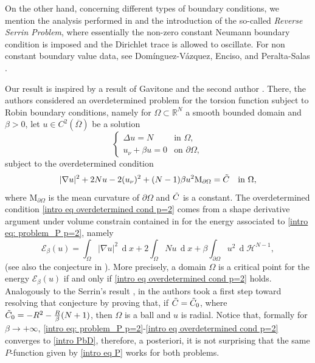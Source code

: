 \documentclass[10pt,a4paper, reqno]{amsart}
\numberwithin{equation}{section}
\newcommand{\R}{\mathbb{R}}
\renewcommand{\d}[1]{\ensuremath{\operatorname{d}\!{#1}}}
\begin{document}
On the other hand, concerning different types of boundary conditions, we mention the analysis performed in \cite{mmp} and the introduction of the so-called \textit{Reverse Serrin Problem}, where essentially the non-zero constant Neumann boundary condition is imposed and the Dirichlet trace is allowed to oscillate. For non constant boundary value data, see Dom\'inguez-V\'azquez, Enciso, and Peralta-Salas \cite{dep23}. 

Our result is inspired by a result of Gavitone and the second author \cite{gamo26}. There, the authors considered an overdetermined problem for the torsion function subject to Robin boundary conditions, namely for $\Omega \subset \R^N$ a smooth bounded domain and $\beta > 0$, let $u \in C^2(\overline{\Omega})$ be a solution
\begin{equation} \label{intro eq: problem_P p=2}
    \begin{cases}
    \Delta u = N & \text{in } \Omega, \\
    u_\nu  + \beta u = 0 & \text{on } \partial\Omega,
    \end{cases}
\end{equation}
subject to the overdetermined condition
\begin{equation}\label{intro eq overdetermined cond p=2}
    |\nabla u|^2 + 2Nu - 2(u_\nu)^2 + (N-1) \beta u^2 \mathrm{M}_{\partial\Omega} = \Tilde{C} \quad \text{in } \Omega,
\end{equation}
where $\mathrm{M}_{\partial\Omega}$ is the mean curvature of $\partial \Omega$ and $\Tilde{C}$ is a constant. The overdetermined condition \eqref{intro eq overdetermined cond p=2} comes from a shape derivative argument under volume constrain contained in \cite{bw} for the energy associated to \eqref{intro eq: problem_P p=2}, namely 
\begin{equation*}
    \mathcal{E}_{\beta}(u) = \int_{\Omega} |\nabla u|^2 \,\d{x} + 2 \int_{\Omega} N u \,\d x + \beta  \int_{\partial\Omega} u^2 \, \d{}\mathcal{H}^{N-1},
\end{equation*}
(see also the conjecture in \cite[Thm. 4.1 \& Ex. 4.1]{bw}). More precisely, a domain $\Omega$ is a critical point for the energy $ \mathcal{E}_{\beta}(u)$ if and only if \eqref{intro eq overdetermined cond p=2} holds. Analogously to the Serrin's result \cite{serrin}, in \cite{gamo26} the authors took a first step toward resolving that conjecture by proving that, if $\Tilde{C} = \Tilde{C}_0$, where $\Tilde{C}_0 = -R^{2} - \frac{R}{\beta} (N + 1)$, then $\Omega$ is a ball and $u$ is radial. Notice that, formally for $\beta \to +\infty$, \eqref{intro eq: problem_P p=2}-\eqref{intro eq overdetermined cond p=2} converges to \eqref{intro PbD}, therefore, a posteriori, it is not surprising that the same $P$-function given by \eqref{intro eq P} works for both problems.
\end{document}
